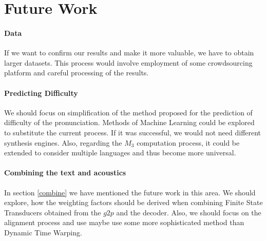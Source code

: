 \section{Future Work}
\paragraph{Data}
If we want to confirm our results and make it more valuable, we have to obtain larger datasets.
This process would involve employment of some crowdsourcing platform and careful processing of the results.
\paragraph{Predicting Difficulty}
We should focus on simplification of the method proposed for the prediction of difficulty of the pronunciation.
Methods of Machine Learning could be explored to substitute the current process.
If it was successful, we would not need different synthesis engines.
Also, regarding the $M_3$ computation process, it could be extended to consider multiple languages and thus become more universal.
\paragraph{Combining the text and acoustics}
In section \ref{combine} we have mentioned the future work in this area.
We should explore, how the weighting factors should be derived when combining Finite State Transducers obtained from the $g2p$ and the decoder.
Also, we should focus on the alignment process and use maybe use some more sophisticated method than Dynamic Time Warping.
